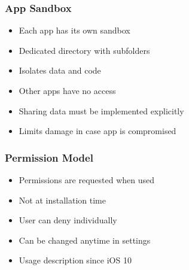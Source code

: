 \subsubsection{App Sandbox}
\begin{itemize}
    \item Each app has its own sandbox
    \item Dedicated directory with subfolders
    \item Isolates data and code
    \item Other apps have no access
    \item Sharing data must be implemented explicitly
    \item Limits damage in case app is compromised
\end{itemize}

\subsubsection{Permission Model}
\begin{itemize}
    \item Permissions are requested when used
    \item Not at installation time
    \item User can deny individually
    \item Can be changed anytime in settings
    \item Usage description since iOS 10
\end{itemize}

